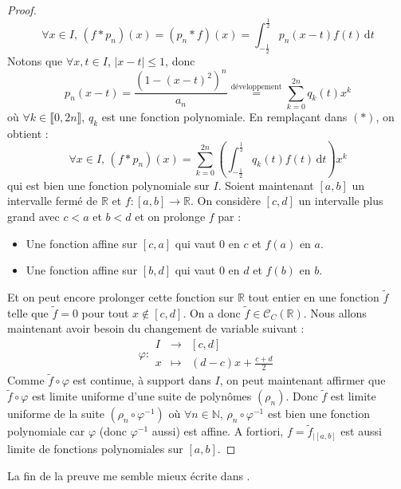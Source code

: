 \begin{proof}
    \[ \forall x \in I, \, (f*p_n)(x) = (p_n*f)(x) = \int_{-\frac{1}{2}}^{\frac{1}{2}} p_n(x-t) f(t) \, \mathrm{d}t \tag{$*$} \]
    Notons que $\forall x, t \in I$, $|x-t| \leq 1$, donc
    \[ p_n(x-t) = \frac{(1 - (x-t)^2)^n}{a_n} \overset{\text{développement}}{=} \sum_{k=0}^{2n} q_k(t) x^k \]
    où $\forall k \in \llbracket 0, 2n \rrbracket$, $q_k$ est une fonction polynomiale. En remplaçant dans $(*)$, on obtient :
    \[ \forall x \in I, \, (f*p_n)(x) = \sum_{k=0}^{2n} \left( \int_{-\frac{1}{2}}^{\frac{1}{2}} q_k(t) f(t) \, \mathrm{d}t \right) x^k \]
    qui est bien une fonction polynomiale sur $I$.
    \newpar
    Soient maintenant $[a,b]$ un intervalle fermé de $\mathbb{R}$ et $f : [a, b] \rightarrow \mathbb{R}$. On considère $[c, d]$ un intervalle plus grand avec $c < a$ et $b < d$ et on prolonge $f$ par :
    \begin{itemize}
      \item Une fonction affine sur $[c, a]$ qui vaut $0$ en $c$ et $f(a)$ en $a$.
      \item Une fonction affine sur $[b, d]$ qui vaut $0$ en $d$ et $f(b)$ en $b$.
    \end{itemize}
    Et on peut encore prolonger cette fonction sur $\mathbb{R}$ tout entier en une fonction $\widetilde{f}$ telle que $\widetilde{f} = 0$ pour tout $x \notin [c, d]$. On a donc $\widetilde{f} \in \mathcal{C}_C(\mathbb{R})$. Nous allons maintenant avoir besoin du changement de variable suivant :
    \[ \varphi :
    \begin{array}{ccc}
      I &\rightarrow& [c, d] \\
      x &\mapsto& (d-c)x + \frac{c+d}{2}
    \end{array}
    \]
    Comme $\widetilde{f} \circ \varphi$ est continue, à support dans $I$, on peut maintenant affirmer que $\widetilde{f} \circ \varphi$ est limite uniforme d'une suite de polynômes $(\rho_n)$. Donc $\widetilde{f}$ est limite uniforme de la suite $(\rho_n \circ \varphi^{-1})$ où $\forall n \in \mathbb{N}$, $\rho_n \circ \varphi^{-1}$ est bien une fonction polynomiale car $\varphi$ (donc $\varphi^{-1}$ aussi) est affine. A fortiori, $f = \widetilde{f}_{|[a,b]}$ est aussi limite de fonctions polynomiales sur $[a,b]$.
  \end{proof}

  La fin de la preuve me semble mieux écrite dans \cite{[I-P]}.

